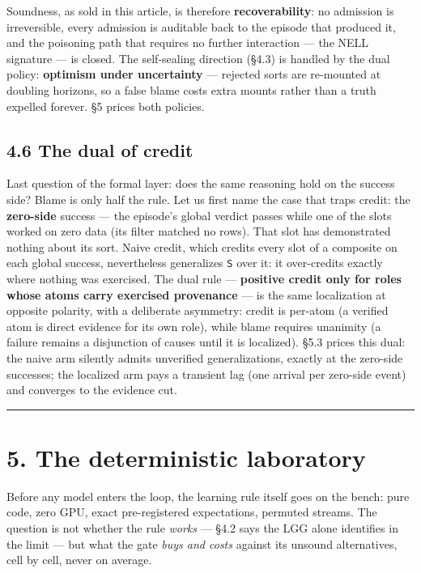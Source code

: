 \documentclass[11pt]{article}
\begin{document}
Soundness, as sold in this article, is therefore \textbf{recoverability}: no admission is irreversible, every admission is auditable back to the episode that produced it, and the poisoning path that requires no further interaction — the NELL signature — is closed. The self-sealing direction (§4.3) is handled by the dual policy: \textbf{optimism under uncertainty} — rejected sorts are re-mounted at doubling horizons, so a false blame costs extra mounts rather than a truth expelled forever. §5 prices both policies.

\subsection*{4.6 The dual of credit}

Last question of the formal layer: does the same reasoning hold on the success side? Blame is only half the rule. Let us first name the case that traps credit: the \textbf{zero-side} success — the episode's global verdict passes while one of the slots worked on zero data (its filter matched no rows). That slot has demonstrated nothing about its sort. Naive credit, which credits every slot of a composite on each global success, nevertheless generalizes \texttt{S} over it: it over-credits exactly where nothing was exercised. The dual rule — \textbf{positive credit only for roles whose atoms carry exercised provenance} — is the same localization at opposite polarity, with a deliberate asymmetry: credit is per-atom (a verified atom is direct evidence for its own role), while blame requires unanimity (a failure remains a disjunction of causes until it is localized). §5.3 prices this dual: the naive arm silently admits unverified generalizations, exactly at the zero-side successes; the localized arm pays a transient lag (one arrival per zero-side event) and converges to the evidence cut.

\medskip\hrule\medskip

\section*{5. The deterministic laboratory}

Before any model enters the loop, the learning rule itself goes on the bench: pure code, zero GPU, exact pre-registered expectations, permuted streams. The question is not whether the rule \emph{works} — §4.2 says the LGG alone identifies in the limit — but what the gate \emph{buys and costs} against its unsound alternatives, cell by cell, never on average.
\end{document}

